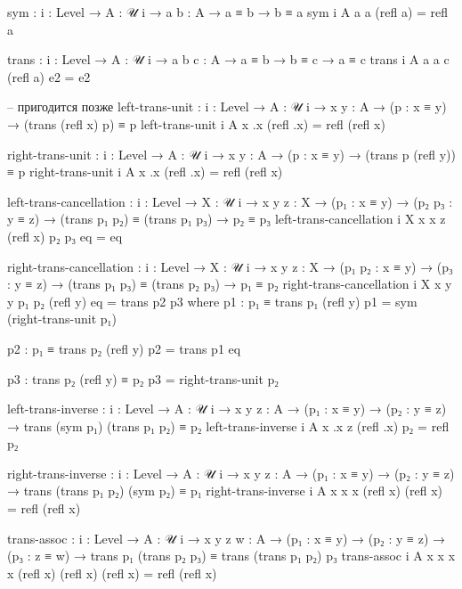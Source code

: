 \documentclass{article}[12pt]
\begin{document}
\begin{code}
sym : {i : Level} → {A : 𝒰 i} → {a b : A} → a ≡ b → b ≡ a
sym {i} {A} {a} {a} (refl a) = refl a

trans : {i : Level} → {A : 𝒰 i} → {a b c : A}
        → a ≡ b → b ≡ c → a ≡ c
trans {i} {A} {a} {a} {c} (refl a) e2 = e2

-- пригодится позже
left-trans-unit : {i : Level} → {A : 𝒰 i}
                  → {x y : A}
                  → (p : x ≡ y)
                  → (trans (refl x) p) ≡ p
left-trans-unit {i} {A} {x} {.x} (refl .x) = refl (refl x)

right-trans-unit : {i : Level} → {A : 𝒰 i}
                  → {x y : A}
                  → (p : x ≡ y)
                  → (trans p (refl y)) ≡ p
right-trans-unit {i} {A} {x} {.x} (refl .x) = refl (refl x)

left-trans-cancellation : {i : Level} → {X : 𝒰 i}
     → {x y z : X}
     → (p₁ : x ≡ y)
     → (p₂ p₃ : y ≡ z)
     → (trans p₁ p₂) ≡ (trans p₁ p₃)
     → p₂ ≡ p₃
left-trans-cancellation {i} {X} {x} {x} {z} (refl x) p₂ p₃ eq = eq

right-trans-cancellation : {i : Level} → {X : 𝒰 i}
     → {x y z : X}
     → (p₁ p₂ : x ≡ y)
     → (p₃ : y ≡ z)
     → (trans p₁ p₃) ≡ (trans p₂ p₃)
     → p₁ ≡ p₂
right-trans-cancellation {i} {X} {x} {y} {y} p₁ p₂ (refl y) eq = trans p2 p3
    where
        p1 : p₁ ≡ trans p₁ (refl y)
        p1 = sym (right-trans-unit p₁)

        p2 : p₁ ≡ trans p₂ (refl y)
        p2 = trans p1 eq

        p3 : trans p₂ (refl y) ≡ p₂
        p3 = right-trans-unit p₂

left-trans-inverse : {i : Level} → {A : 𝒰 i} → {x y z : A}
                     → (p₁ : x ≡ y) 
                     → (p₂ : y ≡ z)
                     → trans (sym p₁) (trans p₁ p₂) ≡ p₂
left-trans-inverse {i} {A} {x} {.x} {z} (refl .x) p₂ = refl p₂

right-trans-inverse : {i : Level} → {A : 𝒰 i} → {x y z : A}
                     → (p₁ : x ≡ y) 
                     → (p₂ : y ≡ z)
                     → trans (trans p₁ p₂) (sym p₂) ≡ p₁
right-trans-inverse {i} {A} {x} {x} {x} (refl x) (refl x) = refl (refl x)

trans-assoc : {i : Level} → {A : 𝒰 i} → {x y z w : A}
    → (p₁ : x ≡ y)
    → (p₂ : y ≡ z)
    → (p₃ : z ≡ w)
    → trans p₁ (trans p₂ p₃) ≡ trans (trans p₁ p₂) p₃
trans-assoc {i} {A} {x} {x} {x} {x} 
    (refl x) (refl x) (refl x) = refl (refl x)
\end{code}
\end{document}
